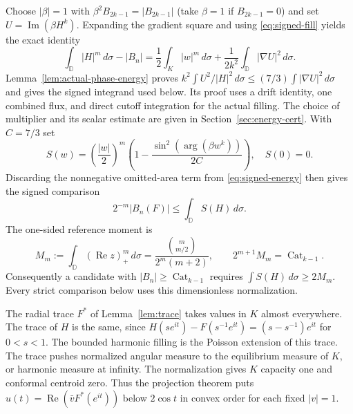 \documentclass[11pt]{article}
\newcommand{\D}{\mathbb D}
\newcommand{\Cat}{\operatorname{Cat}}
\begin{document}
	Choose $|\beta|=1$ with $\beta^2B_{2k-1}=|B_{2k-1}|$
	(take $\beta=1$ if $B_{2k-1}=0$) and set
	$U=\operatorname{Im}(\beta H^k)$.  Expanding the gradient square
	and using \eqref{eq:signed-fill} yields the exact identity
	\begin{equation}\label{eq:signed-energy}
		\int_{\D}|H|^m\,d\sigma-|B_n|
		=\frac12\int_K|w|^m\,d\sigma
		+\frac1{2k^2}\int_{\D}|\nabla U|^2\,d\sigma.
	\end{equation}
	Lemma~\ref{lem:actual-phase-energy} proves
	$k^2\int U^2/|H|^2\,d\sigma\leq
	(7/3)\int|\nabla U|^2\,d\sigma$
	and gives the signed integrand used below.  Its proof uses a drift
	identity, one combined flux, and direct cutoff integration for the
	actual filling.  The choice of multiplier and its scalar estimate are
	given in Section~\ref{sec:energy-cert}.
	With $C=7/3$ set
	\[
	S(w)=\left(\frac{|w|}{2}\right)^m
	\left(1-\frac{\sin^2(\arg(\beta w^k))}{2C}\right),
	\quad S(0)=0.
	\]
	Discarding the nonnegative omitted-area term from
	\eqref{eq:signed-energy} then gives the signed comparison
	\begin{equation}\label{eq:signed-criterion}
		2^{-m}|B_n(F)|\leq\int_{\D}S(H)\,d\sigma.
	\end{equation}
	The one-sided reference moment is
	\begin{equation}\label{eq:reference-moment}
		M_m:=\int_{\D}(\operatorname{Re}z)_+^m\,d\sigma
		=\frac{\binom{m}{m/2}}{2^m(m+2)},
		\qquad 2^{m+1}M_m=\Cat_{k-1}.
	\end{equation}
	Consequently a candidate with $|B_n|\geq\Cat_{k-1}$ requires
	$\int S(H)\,d\sigma\geq2M_m$.  Every strict comparison below
	uses this dimensionless normalization.
	
	The radial trace $F^*$ of Lemma~\ref{lem:trace} takes values in $K$
	almost everywhere. The trace of $H$ is the same, since
	$H(se^{it})-F(s^{-1}e^{it})=(s-s^{-1})e^{it}$ for $0<s<1$.
	The bounded harmonic filling is the Poisson extension of this trace.
	The trace pushes normalized angular measure to the equilibrium measure
	of $K$, or harmonic measure at infinity. The normalization gives
	$K$ capacity one and conformal centroid zero. Thus the projection
	theorem \cite[Theorem~2]{BLP} puts
	$u(t)=\operatorname{Re}(\bar v F^*(e^{it}))$ below $2\cos t$ in convex
	order for each fixed $|v|=1$.
	
\end{document}
